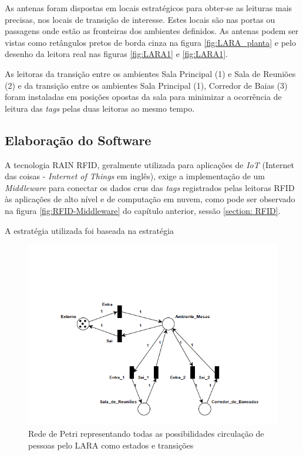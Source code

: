 As antenas foram dispostas em locais estratégicos para obter-se as leituras mais precisas, nos locais de transição de interesse. Estes locais são nas portas ou passagens onde estão as fronteiras dos ambientes definidos. As antenas podem ser vistas como retângulos pretos de borda cinza na figura \ref{fig:LARA_planta} e pelo desenho da leitora real nas figuras \ref{fig:LARA1} e \ref{fig:LARA1}.

As leitoras da transição entre os ambientes Sala Principal (1) e Sala de Reuniões (2) e da transição entre os ambientes Sala Principal (1), Corredor de Baias (3) foram instaladas em posições opostas da sala para minimizar a ocorrência de leitura das \textit{tags} pelas duas leitoras ao mesmo tempo.

 \subsection{Elaboração do Software}
 
 A tecnologia RAIN RFID, geralmente utilizada para aplicações de \textit{IoT} (Internet das coisas - \textit{Internet of Things} em inglês), exige a implementação de um \textit{Middleware} para conectar os dados crus das \textit{tags} registrados pelas leitoras RFID às aplicações de alto nível e de computação em nuvem, como pode ser observado na figura \ref{fig:RFID-Middleware} do capítulo anterior, sessão \ref{section: RFID}.
 
 A estratégia utilizada foi baseada na estratégia
 

 
 
 \begin{figure}[H]
    \centering
    \includegraphics[width=0.8\linewidth]{figs/Metodologia/Petri_net.png}
    \caption{Rede de Petri representando todas as possibilidades circulação de pessoas pelo LARA como estados e transições}
    \label{fig:Petri1}
\end{figure}

